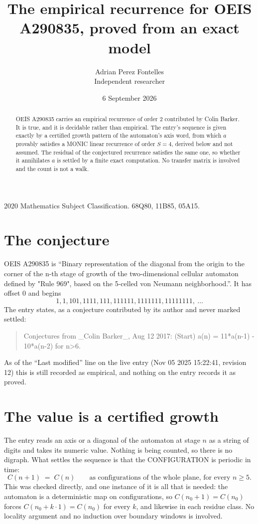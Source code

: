 \documentclass[11pt,a4paper]{article}
\title{The empirical recurrence for OEIS A290835, proved from an exact model}
\author{Adrian Perez Fontelles\\ \small Independent researcher}
\date{6 September 2026}
\theoremstyle{plain}
\theoremstyle{definition}
\begin{document}
\maketitle

\begin{abstract}
OEIS A290835 carries an empirical recurrence of order $2$ contributed by Colin Barker. It is true, and it is
decidable rather than empirical. The entry's sequence is given exactly by a certified growth pattern of the automaton's axis word, from
which $a$ provably satisfies a MONIC linear recurrence of order $S=4$, derived below and not
assumed. The residual of the conjectured recurrence satisfies the same one, so whether it
annihilates $a$ is settled by a finite exact computation. No transfer matrix is involved and
the count is not a walk.
\end{abstract}

\noindent\small 2020 Mathematics Subject Classification. 68Q80, 11B85, 05A15.\normalsize

\section{The conjecture}

OEIS A290835 is ``Binary representation of the diagonal from the origin to the corner of the n-th stage of growth of the two-dimensional cellular automaton defined by "Rule 969", based on the 5-celled von Neumann neighborhood.''. It has offset $0$ and begins
\[
1, 1, 101, 1111, 111, 111111, 1111111, 11111111,\ \dots
\]
The entry states, as a conjecture contributed by its author and never marked settled:
\begin{quote}
Conjectures from \_Colin Barker\_, Aug 12 2017: (Start) a(n) = 11*a(n-1) - 10*a(n-2) for n>6.
\end{quote}
As of the ``Last modified'' line on the live entry (Nov 05 2025 15:22:41, revision 12)
this is still recorded as empirical, and nothing on the entry records it as proved.

\section{The value is a certified growth}

The entry reads an axis or a diagonal of the automaton at stage $n$ as a string of digits and
takes its numeric value. Nothing is being counted, so there is no digraph. What settles the
sequence is that the CONFIGURATION is periodic in time:
\[
C(n+1)\;=\;C(n)\qquad\text{as configurations of the whole plane, for every } n\ge 5.
\]
This was checked directly, and one instance of it is all that is needed: the automaton is a
deterministic map on configurations, so $C(n_0+1)=C(n_0)$ forces $C(n_0+k\cdot1)=C(n_0)$ for
every $k$, and likewise in each residue class. No locality argument and no induction over
boundary windows is involved.
\end{document}
